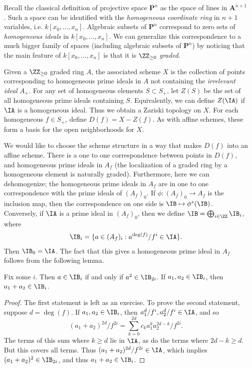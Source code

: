 Recall the classical definition of projective space $\mathbf{P}^n$ as the space of lines in $\mathbf{A}^{n+1}$. Such a space can be identified with the \emph{homogeneous coordinate ring} in $n+1$ variables, i.e. $k[x_0,\dots,x_n]$. Algebraic subsets of $\mathbf{P}^n$ correspond to zero sets of \emph{homogeneous ideals} in $k[x_0,\dots,x_n]$. We can generalize this correspondence to a much bigger family of spaces (including algebraic subsets of $\mathbf{P}^n$) by noticing that the main feature of $k[x_0,\dots,x_n]$ is that it is $\ZZ_{\geq 0}$ \emph{graded}.

Given a $\ZZ_{\geq 0}$ graded ring $A$, the associated scheme $X$ is the collection of points corresponding to homogeneous prime ideals in $A$ not containing the \emph{irrelevant ideal} $A_+$. For any set of homogeneous elements $S \subset S_+$, let $Z(S)$ be the set of all homogeneous prime ideals containing $S$. Equivalently, we can define $Z(\IA)$ if $\IA$ is a homogeneous ideal. Thus we obtain a Zariski topology on $X$. For each homogeneous $f \in S_+$, define $D(f) = X - Z(f)$. As with affine schemes, these form a basis for the open neighborhoods for $X$. 

We would like to choose the scheme structure in a way that makes $D(f)$ into an affine scheme. There is a one to one correspondence between points in $D(f)$, and homogeneous prime ideals in $A_f$ (the localization of a graded ring by a homogeneous element is naturally graded). Furthermore, here we can dehomogenize; the homogeneous prime ideals in $A_f$ are in one to one correspondence with the prime ideals of $(A_f)_0$. If $\phi: (A_f)_0 \to A_f$ is the inclusion map, then the correspondence on one side is $\IB \mapsto \phi^*(\IB)$. Conversely, if $\IA$ is a prime ideal in $(A_f)_0$, then we define $\IB = \bigoplus_{i \in \ZZ} \IB_i$, where
%
\[ \IB_i = \{ a \in (A_f)_i : a^{\deg(f)}/f^i \in \IA \}. \]
%
Then $\IB_0 = \IA$. The fact that this gives a homogeneous prime ideal in $A_f$ follows from the following lemma.

\begin{lemma}
    Fix some $i$. Then $a \in \IB_i$ if and only if $a^2 \in \IB_{2i}$. If $a_1,a_2 \in \IB_i$, then $a_1 + a_2 \in \IB_i$.
\end{lemma}
\begin{proof}
    The first statement is left as an exercise. To prove the second statement, suppose $d = \deg(f)$. If $a_1,a_2 \in \IB_i$, then $a_1^d / f^i, a_2^d / f^i \in \IA$, and so
    \[ (a_1 + a_2)^{2d} / f^{2i} = \sum_{k = 0}^{2d} c_k a_1^k a_2^{2d - k} / f^{2i}. \]
    The terms of this sum where $k \geq d$ lie in $\IA$, as do the terms where $2 d - k \geq d$. But this covers all terms. Thus $(a_1 + a_2)^{2 d} / f^{2i} \in \IA$, which implies $(a_1 + a_2)^2 \in \IB_{2i}$, and thus $a_1 + a_2 \in \IB_i$. 
\end{proof}

